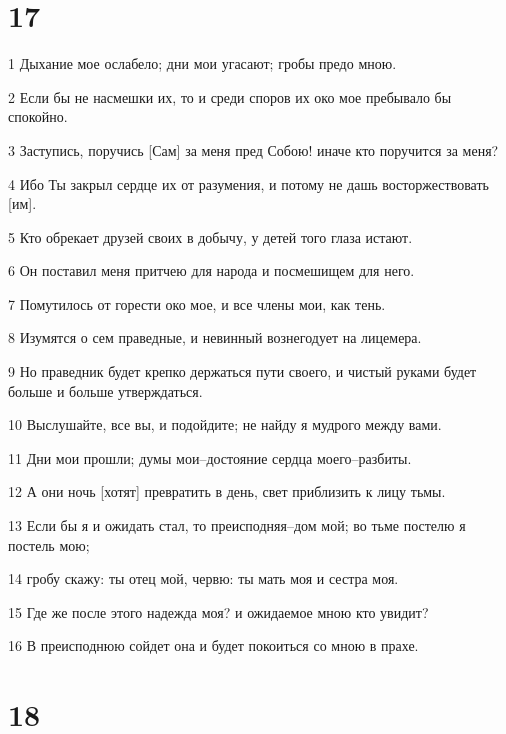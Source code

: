\chapter{17}

\par 1 Дыхание мое ослабело; дни мои угасают; гробы предо мною.
\par 2 Если бы не насмешки их, то и среди споров их око мое пребывало бы спокойно.
\par 3 Заступись, поручись [Сам] за меня пред Собою! иначе кто поручится за меня?
\par 4 Ибо Ты закрыл сердце их от разумения, и потому не дашь восторжествовать [им].
\par 5 Кто обрекает друзей своих в добычу, у детей того глаза истают.
\par 6 Он поставил меня притчею для народа и посмешищем для него.
\par 7 Помутилось от горести око мое, и все члены мои, как тень.
\par 8 Изумятся о сем праведные, и невинный вознегодует на лицемера.
\par 9 Но праведник будет крепко держаться пути своего, и чистый руками будет больше и больше утверждаться.
\par 10 Выслушайте, все вы, и подойдите; не найду я мудрого между вами.
\par 11 Дни мои прошли; думы мои--достояние сердца моего--разбиты.
\par 12 А они ночь [хотят] превратить в день, свет приблизить к лицу тьмы.
\par 13 Если бы я и ожидать стал, то преисподняя--дом мой; во тьме постелю я постель мою;
\par 14 гробу скажу: ты отец мой, червю: ты мать моя и сестра моя.
\par 15 Где же после этого надежда моя? и ожидаемое мною кто увидит?
\par 16 В преисподнюю сойдет она и будет покоиться со мною в прахе.

\chapter{18}

